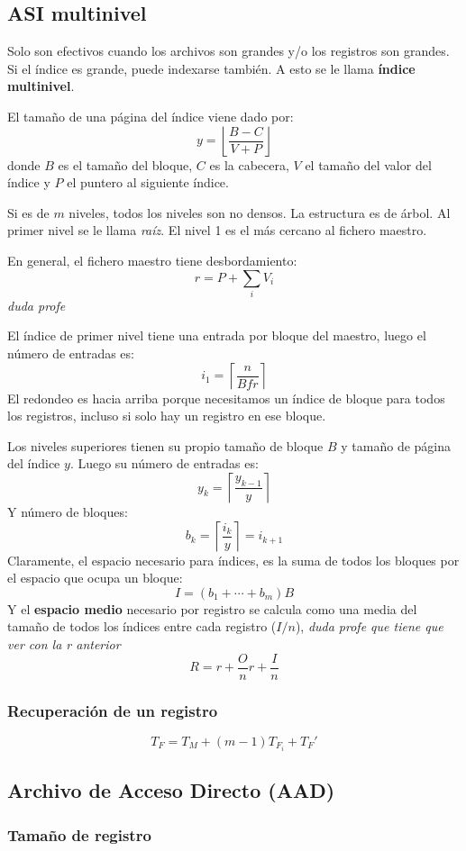 \subsection{ASI multinivel}

Solo son efectivos cuando los archivos son grandes y/o los registros son grandes. Si el índice es grande, puede indexarse también. A esto se le llama \textbf{índice multinivel}.

El tamaño de una página del índice viene dado por:
\[
y=\left\lfloor\frac{B-C}{V+P}\right\rfloor
\]
donde $B$ es el tamaño del bloque, $C$ es la cabecera, $V$ el tamaño del valor del índice y $P$ el puntero al siguiente índice.

Si es de $m$ niveles, todos los niveles son no densos. La estructura es de árbol. Al primer nivel se le llama \textit{raíz}. El nivel 1 es el más cercano al fichero maestro.

En general, el fichero maestro tiene desbordamiento:
\[
r=P+\sum_iV_i
\]
\textit{duda profe}

El índice de primer nivel tiene una entrada por bloque del maestro, luego el número de entradas es:
\[
i_1=\left\lceil\frac{n}{Bfr}\right\rceil
\]
El redondeo es hacia arriba porque necesitamos un índice de bloque para todos los registros, incluso si solo hay un registro en ese bloque.

Los niveles superiores tienen su propio tamaño de bloque $B$ y tamaño de página del índice $y$. Luego su número de entradas es:
\[
y_k=\left\lceil\frac{y_{k-1}}{y}\right\rceil
\]
Y número de bloques:
\[
b_k=\left\lceil\frac{i_k}{y}\right\rceil=i_{k+1}
\]
Claramente, el espacio necesario para índices, es la suma de todos los bloques por el espacio que ocupa un bloque:
\[
I=(b_1+\cdots+b_m)B
\]
Y el \textbf{espacio medio} necesario por registro se calcula como una media del tamaño de todos los índices entre cada registro ($I/n$), 
\textit{duda profe que tiene que ver con la r anterior}
\[
R=r+\frac{O}{n}r+\frac{I}{n}
\]

\subsubsection{Recuperación de un registro}

\[
T_F=T_M+(m-1)T_{F_i}+T_F'
\]
\subsection{Archivo de Acceso Directo (AAD)}

\subsubsection{Tamaño de registro}
